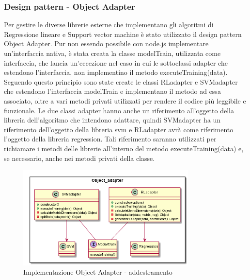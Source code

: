 \documentclass[../manuale-sviluppatore.tex]{subfiles}
\begin{document}
\subsubsection{Design pattern - Object Adapter}
\label{ssec:design_pattern_object_adapter}
Per gestire le diverse librerie esterne che implementano gli algoritmi di Regressione lineare e Support vector machine è stato utilizzato il design pattern Object Adapter.
Pur non essendo possibile con node.js implementare un'interfaccia nativa, è stata creata la classe modelTrain, utilizzata come interfaccia, che lancia un'eccezione nel caso
in cui le sottoclassi adapter che estendono l'interfaccia, non implementino il metodo executeTraining(data).
Seguendo questo principio sono state create le classi RLadapter e SVMadapter che estendono l'interfaccia modelTrain e implementano il metodo ad essa associato, oltre a vari metodi privati
utilizzati per rendere il codice più leggibile e funzionale.
Le due classi adapter hanno anche un riferimento all'oggetto della libreria dell'algoritmo che intendono adattare, quindi SVMadapter ha un riferimento dell'oggetto della libreria svm e
RLadapter avrà come riferimento l'oggetto della libreria regression. Tali riferimento saranno utilizzati per richiamare i metodi delle librerie all'interno del metodo executeTraining(data)
e, se necessario, anche nei metodi privati della classe.

\begin{figure}[H]
    \begin{center}
         \includegraphics[width=9cm]{img/objectAdapterTA.png}
         \caption{Implementazione Object Adapter - addestramento}
         \label{fig:object_adapter}
     \end{center}
 \end{figure}
\end{document}
